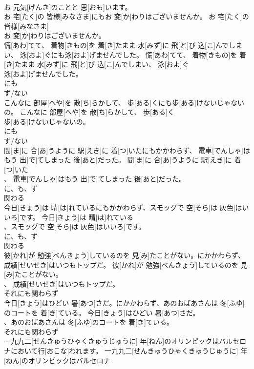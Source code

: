 \documentclass[8pt]{extreport}
\begin{document}
\begin{CJK}{UTF8}{min}
\\	お 元気[げんき]のことと 思[おも]います。	
\\	お 宅[たく]の 皆様[みなさま]にもお 変[か]わりはございませんか。	お 宅[たく]の 皆様[みなさま]
\\	お 変[か]わりはございませんか。	
\\	慌[あわ]てて、 着物[きもの]を 着[き]たまま 水[みず]に 飛[と]び 込[こ]んでしまい、 泳[およ]ぐにも泳[およ]げませんでした。	慌[あわ]てて、 着物[きもの]を 着[き]たまま 水[みず]に 飛[と]び 込[こ]んでしまい、 泳[およ]ぐ
\\	泳[およ]げませんでした。	
\\	にも 
\\	ず/ない 
\\	こんなに 部屋[へや]を 散[ち]らかして、 歩[ある]くにも歩[ある]けないじゃないの。	こんなに 部屋[へや]を 散[ち]らかして、 歩[ある]く
\\	歩[ある]けないじゃないの。	
\\	にも 
\\	ず/ない 
\\	間[ま]に 合[あ]うように 駅[えき]に 着[つ]いたにもかかわらず、 電車[でんしゃ]はもう 出[で]てしまった 後[あと]だった。	間[ま]に 合[あ]うように 駅[えき]に 着[つ]いた
\\	、 電車[でんしゃ]はもう 出[で]てしまった 後[あと]だった。	
\\	に、も、ず 
\\	関わる 
\\	今日[きょう]は 晴[は]れているにもかかわらず、スモッグで 空[そら]は 灰色[はいいろ]です。	今日[きょう]は 晴[は]れている
\\	、スモッグで 空[そら]は 灰色[はいいろ]です。	
\\	に、も、ず 
\\	関わる 
\\	彼[かれ]が 勉強[べんきょう]しているのを 見[み]たことがない。にかかわらず、 成績[せいせき]はいつもトップだ。	彼[かれ]が 勉強[べんきょう]しているのを 見[み]たことがない。
\\	、 成績[せいせき]はいつもトップだ。	
\\	それにも関わらず 
\\	今日[きょう]はひどい 暑[あつ]さだ。にかかわらず、あのおばあさんは 冬[ふゆ]のコートを 着[き]ている。	今日[きょう]はひどい 暑[あつ]さだ。
\\	、あのおばあさんは 冬[ふゆ]のコートを 着[き]ている。	
\\	それにも関わらず 
\\	一九九二[せんきゅうひゃくきゅうじゅうに] 年[ねん]のオリンピックはバルセロナにおいて行[おこな]われます。	一九九二[せんきゅうひゃくきゅうじゅうに] 年[ねん]のオリンピックはバルセロナ

\end{CJK}
\end{document}
